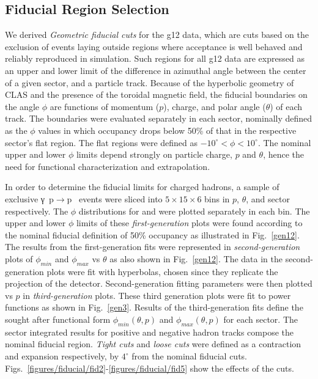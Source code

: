 \subsection{\label{sec:fiducial}Fiducial Region Selection}

We derived \emph{Geometric fiducial cuts} for the g12 data, which are cuts based on the exclusion of events laying outside regions where acceptance is well behaved and reliably reproduced in simulation. Such regions for all g12 data are expressed as an upper and lower limit of the difference in azimuthal angle between the center of a given sector, and a particle track.  Because of the hyperbolic geometry of CLAS and the presence of the toroidal magnetic field, the fiducial boundaries on the angle $\phi$ are functions of momentum ($p$), charge, and polar angle ($\theta$) of each track. The boundaries were evaluated separately in each sector, nominally defined as the $\phi$ values in which occupancy drops below 50\% of that in the respective sector's flat region. The flat regions were defined as $-10^{\circ} < \phi < 10^{\circ}$. The nominal upper and lower $\phi$ limits depend strongly on particle charge, $p$ and $\theta$, hence the need for functional characterization and extrapolation.

In order to determine the fiducial limits for charged hadrons, a sample of exclusive \mbox{γ p$\to$p \π[+] \π[-]} events were sliced into $5\times15\times6$ bins in $p$, $\theta$, and sector respectively. The $\phi$ distributions for \π[+] and \π[-] were plotted separately in each bin. The upper and lower $\phi$ limits of these \emph{first-generation} plots were found according to the nominal fiducial definition of 50\% occupancy as illustrated in Fig.~\ref{gen12}. The results from the first-generation fits were represented in \emph{second-generation} plots of $\phi_{min}$ and $\phi_{max}$ vs $\theta$ as also shown in Fig.~\ref{gen12}.  The data in the second-generation plots were fit with hyperbolas, chosen since they replicate the projection of the detector.  Second-generation fitting parameters were then plotted vs $p$ in \emph{third-generation} plots. These third generation plots were fit to power functions as shown in Fig.~\ref{gen3}. Results of the third-generation fits define the sought after functional form $\phi_{min}(\theta,p)$ and $\phi_{max}(\theta,p)$ for each sector. The sector integrated results for positive and negative hadron tracks compose the nominal fiducial region. \emph{Tight cuts} and \emph{loose cuts} were defined as a contraction and expansion respectively, by $4^\circ$ from the nominal fiducial cuts. Figs.~\ref{figures/fiducial/fid2}-\ref{figures/fiducial/fid5} show the effects of the cuts.

